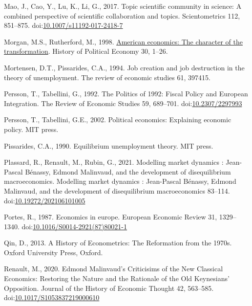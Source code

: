 \documentclass[
  12pt,
  onecolumn]{article}
\newlength{\cslhangindent}
\newlength{\cslentryspacingunit} %
\newenvironment{CSLReferences}[2] %
 {%
  \setlength{\parindent}{0pt}
  \ifodd #1
  \let\oldpar\par
  \def\par{\hangindent=\cslhangindent\oldpar}
  \fi
  \setlength{\parskip}{#2\cslentryspacingunit}
 }%
 {}
\begin{document}
\begin{CSLReferences}{1}{0}
\leavevmode{}%
Mao, J., Cao, Y., Lu, K., Li, G., 2017. Topic scientific community in
science: A combined perspective of scientific collaboration and topics.
Scientometrics 112, 851--875.
doi:\href{https://doi.org/10.1007/s11192-017-2418-7}{10.1007/s11192-017-2418-7}

\leavevmode{}%
Morgan, M.S., Rutherford, M., 1998.
\href{http://search.ebscohost.com/login.aspx?direct=true\&db=bth\&AN=7752144\&lang=fr\&site=ehost-live}{American
economics: The character of the transformation}. History of Political
Economy 30, 1--26.

\leavevmode{}%
Mortensen, D.T., Pissarides, C.A., 1994. Job creation and job
destruction in the theory of unemployment. The review of economic
studies 61, 397415.

\leavevmode{}%
Persson, T., Tabellini, G., 1992. The {Politics} of 1992: {Fiscal
Policy} and {European Integration}. The Review of Economic Studies 59,
689--701. doi:\href{https://doi.org/10.2307/2297993}{10.2307/2297993}

\leavevmode{}%
Persson, T., Tabellini, G.E., 2002. Political economics: Explaining
economic policy. {MIT press}.

\leavevmode{}%
Pissarides, C.A., 1990. Equilibrium unemployment theory. MIT press.

\leavevmode{}%
Plassard, R., Renault, M., Rubin, G., 2021. Modelling market dynamics :
{Jean-Pascal Bénassy}, {Edmond Malinvaud}, and the development of
disequilibrium macroeconomics. Modelling market dynamics : Jean-Pascal
Bénassy, Edmond Malinvaud, and the development of disequilibrium
macroeconomics 83--114.
doi:\href{https://doi.org/10.19272/202106101005}{10.19272/202106101005}

\leavevmode{}%
Portes, R., 1987. Economics in europe. European Economic Review 31,
1329--1340.
doi:\href{https://doi.org/10.1016/S0014-2921(87)80021-1}{10.1016/S0014-2921(87)80021-1}

\leavevmode{}%
Qin, D., 2013. {A History of Econometrics: The Reformation from the
1970s}. {Oxford University Press}, {Oxford}.

\leavevmode{}%
Renault, M., 2020. Edmond {Malinvaud}'s {Criticisims} of the {New
Classical Economics}: {Restoring} the {Nature} and the {Rationale} of
the {Old Keynesians}' {Opposition}. Journal of the History of Economic
Thought 42, 563--585.
doi:\href{https://doi.org/10.1017/S1053837219000610}{10.1017/S1053837219000610}


\end{CSLReferences}
\end{document}
